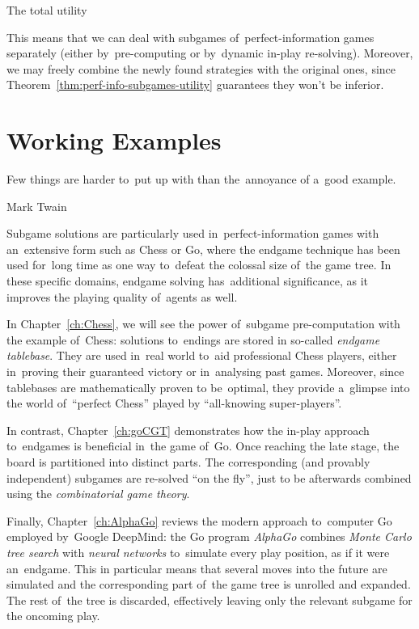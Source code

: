 \begin{cor}
  \todo The total utility
\end{cor}

This means that we can deal with subgames of~perfect-information games separately (either by~pre-computing or by~dynamic in-play re-solving).
Moreover, we may freely combine the newly found strategies with the original ones, since Theorem~\ref{thm:perf-info-subgames-utility} guarantees they won't be inferior.

\section{Working Examples}
\epigraph{
  Few things are harder to~put up with than the~annoyance of a~good example.
}{Mark Twain}
Subgame solutions are particularly used in~perfect-information games with an~extensive form such as Chess or Go, where the endgame technique has been used for~long time as one way to~defeat the colossal size of~the game tree.
In these specific domains, endgame solving has~additional significance, as it improves the playing quality of~agents as well.

In Chapter~\ref{ch:Chess}, we will see the power of~subgame pre-computation with the example of~Chess:
solutions to~endings are stored in so-called \emph{endgame tablebase}.
They are used in~real world to~aid professional Chess players, either in~proving their guaranteed victory or in~analysing past games.
Moreover, since tablebases are mathematically proven to be~optimal, they provide a~glimpse into the world of~``perfect Chess'' played by ``all-knowing super-players''.

In contrast, Chapter~\ref{ch:goCGT} demonstrates how the in-play approach to~endgames is beneficial in~the game of~Go.
Once reaching the late stage, the board is partitioned into distinct parts.
The corresponding (and provably independent) subgames are re-solved ``on the fly'', just to be afterwards combined using the \emph{combinatorial game theory}.

Finally, Chapter~\ref{ch:AlphaGo} reviews the modern approach to~computer Go employed by~Google DeepMind:
the Go program \emph{AlphaGo} combines \emph{Monte Carlo tree search} with \emph{neural networks} to~simulate every play position, as if it were an~endgame.
This in particular means that several moves into the future are simulated and the corresponding part of~the game tree is unrolled and expanded.
The rest of~the tree is discarded, effectively leaving only the relevant subgame for the oncoming play.
